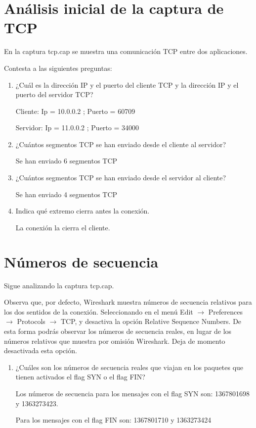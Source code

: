 \documentclass[12pt, a4paper]{report}
\begin{document}
\section{Análisis inicial de la captura de TCP}
En la captura tcp.cap se muestra una comunicación TCP entre dos aplicaciones.

Contesta a las siguientes preguntas:

\begin{enumerate}
	\item ¿Cuál es la dirección IP y el puerto del cliente TCP y la dirección IP y el puerto del servidor TCP?
	
	Cliente: Ip = 10.0.0.2 ; Puerto = 60709
	
	Servidor: Ip = 11.0.0.2 ; Puerto = 34000
	
	\item ¿Cuántos segmentos TCP se han enviado desde el cliente al servidor?
	
	Se han enviado 6 segmentos TCP
	
	\item ¿Cuántos segmentos TCP se han enviado desde el servidor al cliente?
	
	Se han enviado 4 segmentos TCP
	
	\item Indica qué extremo cierra antes la conexión.
	
	La conexión la cierra el cliente.
	
\end{enumerate}

\section{Números de secuencia}
Sigue analizando la captura tcp.cap.

Observa que, por defecto, Wireshark muestra números de secuencia relativos para los dos sentidos de la conexión. Seleccionando en el menú Edit $\rightarrow$ Preferences $\rightarrow$ Protocols $\rightarrow$ TCP, y desactiva la opción Relative Sequence Numbers. De esta forma podrás observar los números de secuencia reales, en lugar de los números relativos que muestra por omisión Wireshark. Deja de momento desactivada esta opción.

\begin{enumerate}
	\item ¿Cuáles son los números de secuencia reales que viajan en los paquetes que tienen activados el flag SYN o el flag FIN?
	
	Los números de secuencia para los mensajes con el flag SYN son: 1367801698 y 1363273423.
	
	Para los mensajes con el flag FIN son: 1367801710 y 1363273424
\end{enumerate}
\end{document}

